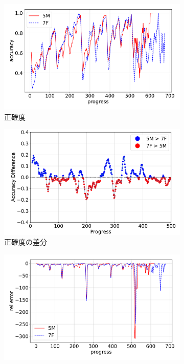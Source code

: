 \begin{figure}[t]
\centering
\begin{subfigure}[b]{0.49\linewidth}
    \includegraphics[width=\linewidth]{pdf/compare/EXP6_NT5M_and_NT7F/accuracy.pdf}
    \caption{正確度}
    \label{fig:EXP6_NT5M_and_NT7F_accuracy}
\end{subfigure}
\begin{subfigure}[b]{0.49\linewidth}
    \includegraphics[width=\linewidth]{pdf/compare/EXP6_NT5M_and_NT7F/acc_diff_plot.pdf}
    \caption{正確度の差分}
    \label{fig:EXP6_NT5M_and_NT7F_acc_diff}
\end{subfigure}
\begin{subfigure}[b]{0.49\linewidth}
    \includegraphics[width=\linewidth]{pdf/compare/EXP6_NT5M_and_NT7F/error_abs.pdf}

\end{subfigure}
\end{figure}
